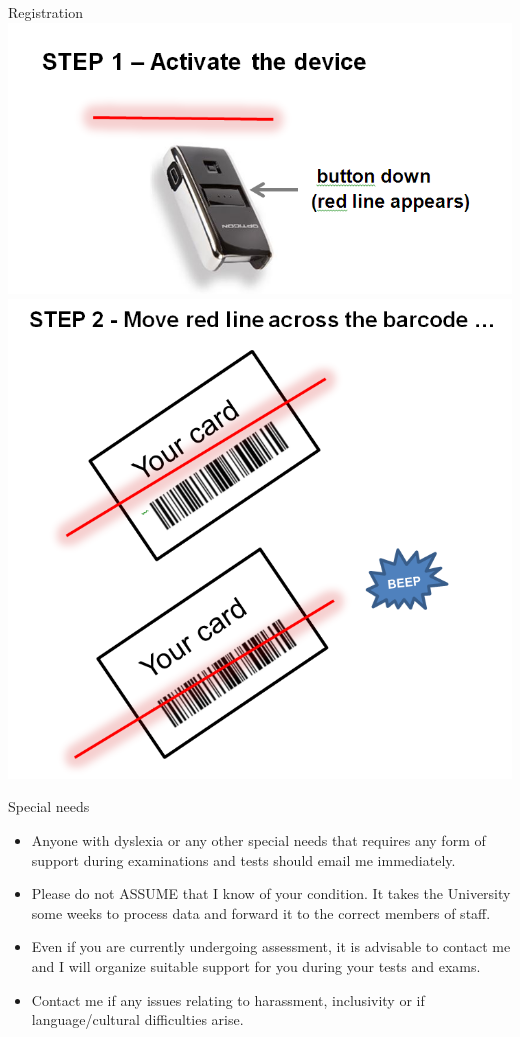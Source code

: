\documentclass[compress]{beamer}
\begin{document}
\begin{frame}{Registration}
        \centering
        \includegraphics[width=0.4\linewidth]{registration1}
        \includegraphics[width=0.4\linewidth]{registration2}
\end{frame}

\begin{frame}{Special needs}

    \begin{itemize}

    \item Anyone with dyslexia or any other special needs that requires any form
        of support during examinations and tests should email me immediately.

    \item Please do not ASSUME that I know of your condition. It takes the
        University some weeks to process data and forward it to the correct
            members of staff.

    \item Even if you are currently undergoing assessment, it is advisable to
        contact me and I will organize suitable support for you during your
            tests and exams.

    \item Contact me if any issues relating to harassment, inclusivity or if
        language/cultural difficulties arise.

    \end{itemize}
\end{frame}
\end{document}
